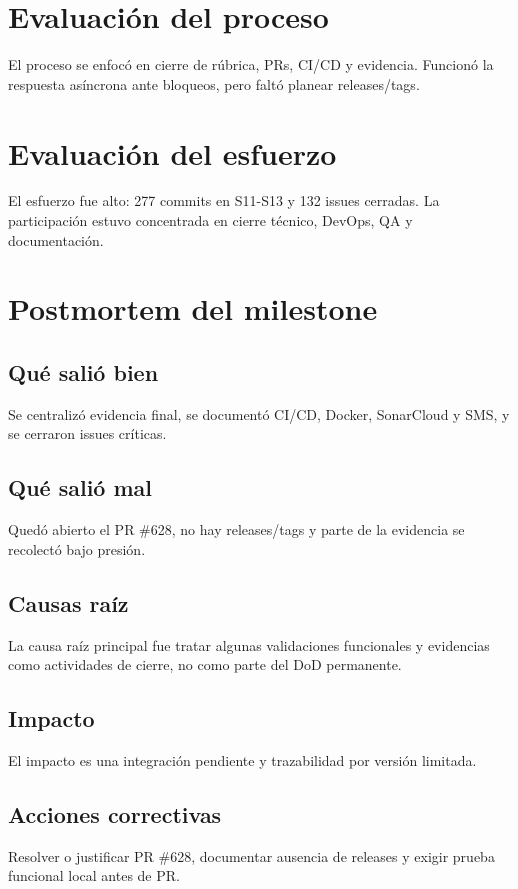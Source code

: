 \documentclass[11pt,a4paper]{article}
\begin{document}
\section{Evaluación del proceso}
El proceso se enfocó en cierre de rúbrica, PRs, CI/CD y evidencia. Funcionó la respuesta asíncrona ante bloqueos, pero faltó planear releases/tags.

\section{Evaluación del esfuerzo}
El esfuerzo fue alto: 277 commits en S11-S13 y 132 issues cerradas. La participación estuvo concentrada en cierre técnico, DevOps, QA y documentación.

\section{Postmortem del milestone}
\subsection{Qué salió bien}
Se centralizó evidencia final, se documentó CI/CD, Docker, SonarCloud y SMS, y se cerraron issues críticas.

\subsection{Qué salió mal}
Quedó abierto el PR \#628, no hay releases/tags y parte de la evidencia se recolectó bajo presión.

\subsection{Causas raíz}
La causa raíz principal fue tratar algunas validaciones funcionales y evidencias como actividades de cierre, no como parte del DoD permanente.

\subsection{Impacto}
El impacto es una integración pendiente y trazabilidad por versión limitada.

\subsection{Acciones correctivas}
Resolver o justificar PR \#628, documentar ausencia de releases y exigir prueba funcional local antes de PR.
\end{document}
